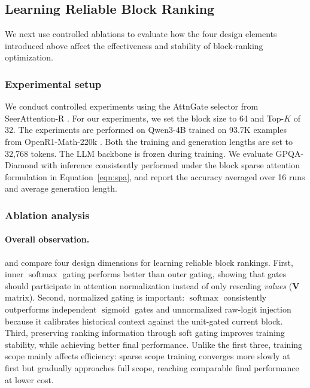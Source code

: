 \subsection{Learning Reliable Block Ranking}
\label{subse:ranking_learn}

We next use controlled ablations to evaluate how the four design elements introduced above affect the effectiveness and stability of block-ranking optimization.

\subsubsection{Experimental setup}
\label{sec:control_setup}
We conduct controlled experiments using the AttnGate selector from SeerAttention-R \cite{gao2025seerattention}.
For our experiments, we set the block size to 64 and Top-$K$ of 32.
The experiments are performed on Qwen3-4B \cite{yang2025qwen3technicalreport} trained on 93.7K examples from OpenR1-Math-220k \cite{openr1}.
Both the training and generation lengths are set to 32{,}768 tokens.
The LLM backbone is frozen during training.
We evaluate GPQA-Diamond \cite{gpqa} with inference consistently performed under the block sparse attention formulation in Equation~\ref{eqn:spa}, and report the accuracy averaged over 16 runs and average generation length.

\subsubsection{Ablation analysis}
\label{sec:abla_analysi}
\paragraph{Overall observation.}
 and  compare four design dimensions for learning reliable block rankings.
First, inner $\operatorname{softmax}$ gating performs better than outer gating, showing that gates should participate in attention normalization instead of only rescaling \emph{values} ($\mathbf{V}$ matrix).
Second, normalized gating is important: $\operatorname{softmax}$ consistently outperforms independent $\operatorname{sigmoid}$ gates and unnormalized raw-logit injection because it calibrates historical context against the unit-gated current block.
Third, preserving ranking information through soft gating improves training stability, while achieving better final performance.
Unlike the first three, training scope mainly affects efficiency: sparse scope training converges more slowly at first but gradually approaches full scope, reaching comparable final performance at lower cost.

